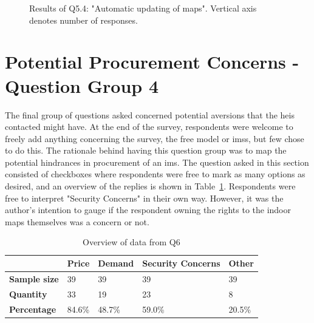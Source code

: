 \begin{figure}[H]
    \centering
    \caption{Results of Q5.4: "Automatic updating of maps". Vertical axis denotes number of responses.}
    \label{fig:q54}
\end{figure}

\newpage

\section{Potential Procurement Concerns - Question Group 4}
The final group of questions asked concerned potential aversions that the \glspl{hei} contacted might have. At the end of the survey, respondents were welcome to freely add anything concerning the survey, the free model or \glspl{ims}, but few chose to do this. The rationale behind having this question group was to map the potential hindrances in procurement of an \gls{ims}. The question asked in this section consisted of checkboxes where respondents were free to mark as many options as desired, and an overview of the replies is shown in Table~\ref{q6}. Respondents were free to interpret "Security Concerns" in their own way. However, it was the author's intention to gauge if the respondent owning the rights to the indoor maps themselves was a concern or not.


\begin{table}[H]
\centering
\caption{Overview of data from Q6}
\label{q6}
\begin{tabular}{l|l|l|l|l|}
\cline{2-5}
                                           & \textbf{Price} & \textbf{Demand} & \textbf{Security Concerns} & \textbf{Other} \\ \hline
\multicolumn{1}{|l|}{\textbf{Sample size}} & 39             & 39              & 39                         & 39             \\ \hline
\multicolumn{1}{|l|}{\textbf{Quantity}}    & 33             & 19              & 23                         & 8              \\ \hline
\multicolumn{1}{|l|}{\textbf{Percentage}}  & 84.6\%         & 48.7\%          & 59.0\%                     & 20.5\%         \\ \hline
\end{tabular}
\end{table}


